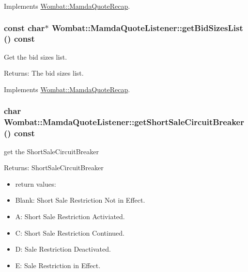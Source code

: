 Implements \hyperlink{classWombat_1_1MamdaQuoteRecap_0f3dfc61d4c0ce17a69505bdb0977267}{Wombat::Mamda\-Quote\-Recap}.\hypertarget{classWombat_1_1MamdaQuoteListener_93be6aa13008fc17858aafac4d212eb5}{
\subsubsection[getBidSizesList]{\setlength{\rightskip}{0pt plus 5cm}const char$\ast$ Wombat::Mamda\-Quote\-Listener::get\-Bid\-Sizes\-List () const}}
\label{classWombat_1_1MamdaQuoteListener_93be6aa13008fc17858aafac4d212eb5}


Get the bid sizes list. 

\begin{Desc}
\item[Returns:]The bid sizes list. \end{Desc}


Implements \hyperlink{classWombat_1_1MamdaQuoteRecap_38b96c274919a6554a103604e582ac87}{Wombat::Mamda\-Quote\-Recap}.\hypertarget{classWombat_1_1MamdaQuoteListener_2638f27bca3f6fa7c673e5b6924e3842}{
\subsubsection[getShortSaleCircuitBreaker]{\setlength{\rightskip}{0pt plus 5cm}char Wombat::Mamda\-Quote\-Listener::get\-Short\-Sale\-Circuit\-Breaker () const}}
\label{classWombat_1_1MamdaQuoteListener_2638f27bca3f6fa7c673e5b6924e3842}


get the Short\-Sale\-Circuit\-Breaker 

\begin{Desc}
\item[Returns:]Short\-Sale\-Circuit\-Breaker \begin{itemize}
\item return values: \item Blank: Short Sale Restriction Not in Effect. \item A: Short Sale Restriction Activiated. \item C: Short Sale Restriction Continued. \item D: Sale Restriction Deactivated. \item E: Sale Restriction in Effect. \end{itemize}
\end{Desc}


